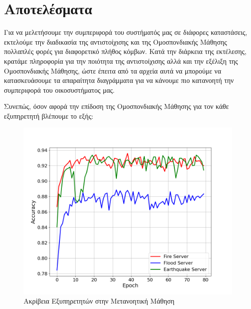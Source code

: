 \section{Αποτελέσματα}

Για να μελετήσουμε την συμπεριφορά του συστήματός μας σε διάφορες καταστάσεις, εκτελούμε την διαδικασία της αντιστοίχισης και της Ομοσπονδιακής Μάθησης πολλαπλές φορές για διαφορετικό πλήθος κόμβων. Κατά την διάρκεια της εκτέλεσης, κρατάμε πληροφορία για την ποιότητα της αντιστοίχισης αλλά και την εξέλιξη της Ομοσπονδιακής Μάθησης, ώστε έπειτα από τα αρχεία αυτά να μπορούμε να κατασκευάσουμε τα απαραίτητα διαγράμματα για να κάνουμε πιο κατανοητή την συμπεριφορά του οικοσυστήματος μας.

Συνεπώς, όσον αφορά την επίδοση της Ομοσπονδιακής Μάθησης για τον κάθε εξυπηρετητή βλέπουμε το εξής:

\begin{figure}[ht]
    \centering
    \includegraphics[width=\textwidth]{figures/chapter4/Server_Accuracies.png}
    \caption{Ακρίβεια Εξυπηρετητών στην Μετανοητική Μάθηση}
    \label{fig17}
\end{figure}

